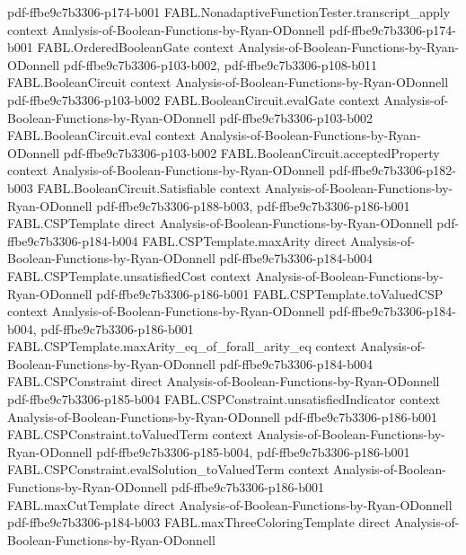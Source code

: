 \begin{theorem}
  {pdf-ffbe9c7b3306-p174-b001}
\proofstep
  {FABL.NonadaptiveFunctionTester.transcript_apply}
  {context}
  {Analysis-of-Boolean-Functions-by-Ryan-ODonnell}
  {pdf-ffbe9c7b3306-p174-b001}
\proofstep
  {FABL.OrderedBooleanGate}
  {context}
  {Analysis-of-Boolean-Functions-by-Ryan-ODonnell}
  {pdf-ffbe9c7b3306-p103-b002,
    pdf-ffbe9c7b3306-p108-b011}
\proofstep
  {FABL.BooleanCircuit}
  {context}
  {Analysis-of-Boolean-Functions-by-Ryan-ODonnell}
  {pdf-ffbe9c7b3306-p103-b002}
\proofstep
  {FABL.BooleanCircuit.evalGate}
  {context}
  {Analysis-of-Boolean-Functions-by-Ryan-ODonnell}
  {pdf-ffbe9c7b3306-p103-b002}
\proofstep
  {FABL.BooleanCircuit.eval}
  {context}
  {Analysis-of-Boolean-Functions-by-Ryan-ODonnell}
  {pdf-ffbe9c7b3306-p103-b002}
\proofstep
  {FABL.BooleanCircuit.acceptedProperty}
  {context}
  {Analysis-of-Boolean-Functions-by-Ryan-ODonnell}
  {pdf-ffbe9c7b3306-p182-b003}
\proofstep
  {FABL.BooleanCircuit.Satisfiable}
  {context}
  {Analysis-of-Boolean-Functions-by-Ryan-ODonnell}
  {pdf-ffbe9c7b3306-p188-b003,
    pdf-ffbe9c7b3306-p186-b001}
\proofstep
  {FABL.CSPTemplate}
  {direct}
  {Analysis-of-Boolean-Functions-by-Ryan-ODonnell}
  {pdf-ffbe9c7b3306-p184-b004}
\proofstep
  {FABL.CSPTemplate.maxArity}
  {direct}
  {Analysis-of-Boolean-Functions-by-Ryan-ODonnell}
  {pdf-ffbe9c7b3306-p184-b004}
\proofstep
  {FABL.CSPTemplate.unsatisfiedCost}
  {context}
  {Analysis-of-Boolean-Functions-by-Ryan-ODonnell}
  {pdf-ffbe9c7b3306-p186-b001}
\proofstep
  {FABL.CSPTemplate.toValuedCSP}
  {context}
  {Analysis-of-Boolean-Functions-by-Ryan-ODonnell}
  {pdf-ffbe9c7b3306-p184-b004,
    pdf-ffbe9c7b3306-p186-b001}
\proofstep
  {FABL.CSPTemplate.maxArity_eq_of_forall_arity_eq}
  {context}
  {Analysis-of-Boolean-Functions-by-Ryan-ODonnell}
  {pdf-ffbe9c7b3306-p184-b004}
\proofstep
  {FABL.CSPConstraint}
  {direct}
  {Analysis-of-Boolean-Functions-by-Ryan-ODonnell}
  {pdf-ffbe9c7b3306-p185-b004}
\proofstep
  {FABL.CSPConstraint.unsatisfiedIndicator}
  {context}
  {Analysis-of-Boolean-Functions-by-Ryan-ODonnell}
  {pdf-ffbe9c7b3306-p186-b001}
\proofstep
  {FABL.CSPConstraint.toValuedTerm}
  {context}
  {Analysis-of-Boolean-Functions-by-Ryan-ODonnell}
  {pdf-ffbe9c7b3306-p185-b004,
    pdf-ffbe9c7b3306-p186-b001}
\proofstep
  {FABL.CSPConstraint.evalSolution_toValuedTerm}
  {context}
  {Analysis-of-Boolean-Functions-by-Ryan-ODonnell}
  {pdf-ffbe9c7b3306-p186-b001}
\proofstep
  {FABL.maxCutTemplate}
  {direct}
  {Analysis-of-Boolean-Functions-by-Ryan-ODonnell}
  {pdf-ffbe9c7b3306-p184-b003}
\proofstep
  {FABL.maxThreeColoringTemplate}
  {direct}
  {Analysis-of-Boolean-Functions-by-Ryan-ODonnell}

\end{theorem}
